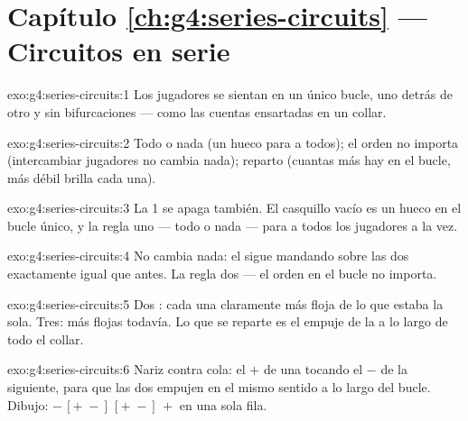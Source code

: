 \section*{Capítulo \ref{ch:g4:series-circuits} --- Circuitos en serie}

\begin{solution}{exo:g4:series-circuits:1}
Los jugadores se sientan en un único bucle, uno detrás de otro y sin
bifurcaciones --- como las cuentas ensartadas en un collar.
\end{solution}

\begin{solution}{exo:g4:series-circuits:2}
Todo o nada (un hueco para a todos); el orden no importa
(intercambiar jugadores no cambia nada); reparto (cuantas más
 hay en el bucle, más débil brilla cada una).
\end{solution}

\begin{solution}{exo:g4:series-circuits:3}
La  1 se apaga también. El casquillo vacío es un hueco en el
bucle único, y la regla uno --- todo o nada --- para a todos los
jugadores a la vez.
\end{solution}

\begin{solution}{exo:g4:series-circuits:4}
No cambia nada: el  sigue mandando sobre las dos
 exactamente igual que antes. La regla dos --- el orden en
el bucle no importa.
\end{solution}

\begin{solution}{exo:g4:series-circuits:5}
Dos : cada una claramente más floja de lo que estaba la
 sola. Tres: más flojas todavía. Lo que se reparte es el
empuje de la  a lo largo de todo el collar.
\end{solution}

\begin{solution}{exo:g4:series-circuits:6}
Nariz contra cola: el $+$ de una tocando el $-$ de la siguiente, para
que las dos empujen en el mismo sentido a lo largo del bucle. Dibujo:
$-\,[{+}\;{-}]\,[{+}\;{-}]\,+$ en una sola fila.
\end{solution}

